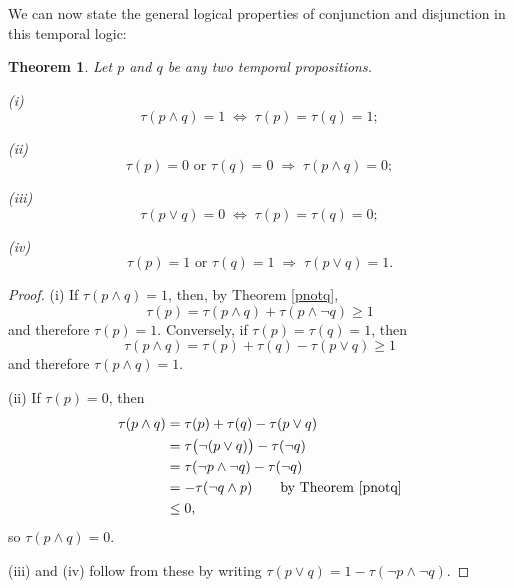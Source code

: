 \documentclass[12pt,a4paper,reqno]{article}
\newcommand{\semilinespace}{\vspace{0.5\baselineskip}}
\newcommand{\upline}{\vspace{-1.2\abovedisplayskip}}
\renewcommand{\(}{\left(}
\renewcommand{\)}{\right)}
\newcommand{\<}{\langle}
\renewcommand{\>}{\rangle}
\newcommand{\impl}{\Longrightarrow}
\theoremstyle{plain} %
\newtheorem{thm}{Theorem}
\begin{document}
We can now state the general logical properties of conjunction and disjunction in this temporal logic:

\begin{thm} \label{truth}
Let $p$ and $q$ be any two temporal propositions. 

\semilinespace

\emph{(i)}\upline
\[
\tau(p\land q) = 1 \; \iff \; \tau(p) = \tau(q) = 1;
\]

\emph{(ii)}\upline
\[
\tau(p) = 0 \text{ or } \tau(q) = 0 \;\impl\; \tau(p\land q) = 0;
\]

\emph{(iii)}\upline
\[
\tau(p\lor q) = 0 \;\iff\; \tau(p) = \tau(q) = 0;
\]

\emph{(iv)}\upline
\[
\tau(p) = 1 \text{ or } \tau(q) = 1 \;\impl\; \tau(p\lor q) = 1.
\]
\end{thm}
\begin{proof}
\noindent (i) If $\tau(p\land q) = 1$, then, by Theorem \ref{pnotq},
\[
\tau(p) = \tau(p\land q) + \tau(p\land\lnot q) \ge 1
\]
and therefore $\tau(p) = 1$. Conversely, if $\tau(p) = \tau(q) = 1$, then 
\[
\tau(p\land q) = \tau(p) + \tau(q) - \tau(p\lor q) \ge 1
\]
and therefore $\tau(p\land q) = 1$.

\semilinespace

\noindent (ii) If $\tau(p) = 0$, then
\begin{align*}
\tau(p\land q) &= \tau(p) + \tau(q) - \tau(p\lor q)\\
&= \tau\big(\lnot(p\lor q)\big) - \tau(\lnot q)\\
&= \tau(\lnot p \land \lnot q) - \tau(\lnot q)\\
&= -\tau(\lnot q\land p) \qquad \text{by Theorem \ref{pnotq}}\\
&\le 0,
\end{align*}
so $\tau(p\land q) = 0$.

\semilinespace

(iii) and (iv) follow from these by writing $\tau(p\lor q) = 1 - \tau(\lnot p\land \lnot q)$. 
\end{proof}
\end{document}
